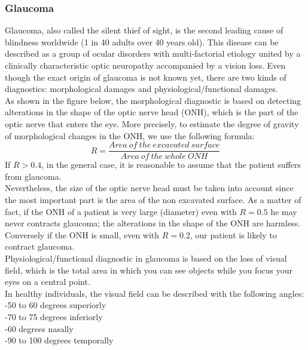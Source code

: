 \documentclass[english,12pt]{article}
\begin{document}
\subsubsection{Glaucoma}
Glaucoma, also called the silent thief of sight, is the second leading cause of blindness worldwide (1 in 40 adults over 40 years old). This disease can be described as a group of ocular disorders with multi-factorial etiology united by a clinically characteristic optic neuropathy accompanied by a vision loss. Even though the exact origin of glaucoma is not known yet, there are two kinds of diagnostics: morphological damages and physiological/functional damages.\\
As shown in the figure below, the morphological diagnostic is based on detecting alterations in the shape of the optic nerve head (ONH), which is the part of the optic nerve that enters the eye.
 More precisely, to estimate the degree of gravity of morphological changes in the ONH, we use the following formula:
$$ R=\frac{Area\ of\ the\ excavated\ surface}{Area\ of\ the\ whole\ ONH}$$
If $R>0.4$, in the general case, it is reasonable to assume that the patient suffers from glaucoma.\\

Nevertheless, the size of the optic nerve head must be taken into account since the most important part is the area of the non excavated surface. As a matter of fact, if the ONH of a patient is very large (diameter) even with $R=0.5$ he may never contracts glaucoma; the alterations in the shape of the ONH are harmless. Conversely if the ONH is small, even with $R=0.2$, our patient is likely to contract glaucoma.\\

Physiological/functional diagnostic in glaucoma is based on the loss of visual field, which is the total area in which you can see objects while you focus your eyes on a central point.\\
In healthy individuals, the visual field can be described with the following angles:\\
-50 to 60 degrees superiorly\\
-70 to 75 degrees inferiorly\\
-60 degrees nasally\\
-90 to 100 degrees temporally\\
\end{document}
